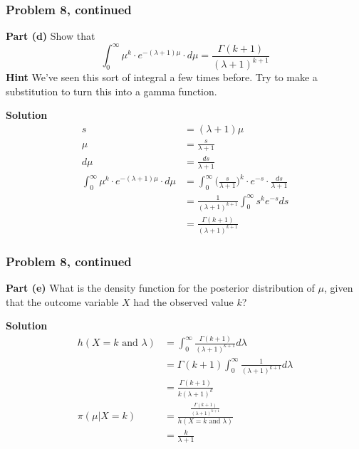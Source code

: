 \documentclass[12pt]{article}
\theoremstyle{definition}
\begin{document}
\newpage

\subsubsection*{Problem 8, continued}

\noindent
{\bf Part (d)} Show that
$$
\int_0^\infty \mu^{k} \cdot e^{-(\lambda+1) \mu} \cdot d\mu = \frac{ \Gamma( k + 1 ) }{(\lambda + 1)^{k+1} }
$$
\noindent
{\bf Hint} We've seen this sort of integral a few times before. Try to make a substitution to turn this into a gamma function.

\bigskip
\noindent
{\bf Solution}
\begin{align*}
s &= (\lambda + 1)\mu\\
\mu &= \frac{s}{\lambda + 1}\\
d\mu &= \frac{ds}{\lambda + 1}\\
\int_0^\infty \mu^{k} \cdot e^{-(\lambda+1) \mu} \cdot d\mu &= \int_0^\infty \biggr(\frac{s}{\lambda + 1}\biggr)^{k} \cdot e^{-s} \cdot \frac{ds}{\lambda + 1}\\
&= \frac{1}{(\lambda + 1)^{k + 1}} \int_0^\infty s^k e^{-s}ds\\
&= \frac{\Gamma(k + 1)}{(\lambda + 1)^{k + 1}}
\end{align*}



\newpage
\subsubsection*{Problem 8, continued}

\noindent
{\bf Part (e)} What is the density function for the posterior distribution of $\mu$, given that the outcome variable $X$ had the observed value $k$?

\bigskip
\noindent
{\bf Solution}
\begin{align*}
h(X=k \text{ and }\lambda) &= \int_0^\infty \frac{\Gamma(k + 1)}{(\lambda + 1)^{k + 1}} d\lambda\\
&= \Gamma(k + 1) \int_0^\infty \frac{1}{(\lambda + 1)^{k + 1}}d\lambda\\
&= \frac{\Gamma(k + 1)}{k(\lambda + 1)^k}\\
\pi(\mu|X=k) &= \frac{\frac{\Gamma(k + 1)}{(\lambda + 1)^{k + 1}}}{h(X=k \text{ and }\lambda)}\\
&= \frac{k}{\lambda + 1}
\end{align*}
\end{document}
